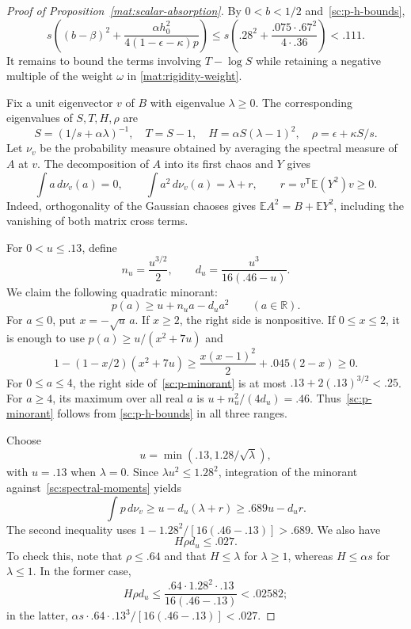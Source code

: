 \documentclass[11pt]{article}
\theoremstyle{definition}
\theoremstyle{remark}
\numberwithin{equation}{section}
\begin{document}
\begin{proof}[Proof of Proposition~\ref{mat:scalar-absorption}]
By $0<b<1/2$ and~\eqref{sc:p-h-bounds},
\begin{equation}\label{sc:y-cost}
 s\left((b-\beta)^2+
 \frac{\alpha h_0^2}{4(1-\epsilon-\kappa)p}\right)
 \le s\left(.28^2+\frac{.075\cdot .67^2}{4\cdot .36}\right)<.111.
\end{equation}
It remains to bound the terms involving $T-\log S$ while retaining a
negative multiple of the weight $\omega$ in
\eqref{mat:rigidity-weight}.

Fix a unit eigenvector $v$ of $B$ with eigenvalue $\lambda\ge0$.
The corresponding eigenvalues of $S,T,H,\rho$
are
\[
 S=(1/s+\alpha\lambda)^{-1},\quad T=S-1,\quad
 H=\alpha S(\lambda-1)^2,\quad \rho=\epsilon+\kappa S/s.
\]
Let $\nu_v$ be the probability measure obtained by averaging the spectral
measure of $A$ at $v$.  The decomposition of $A$ into its first chaos and
$Y$ gives
\begin{equation}\label{sc:spectral-moments}
 \int a\,d\nu_v(a)=0,\qquad
 \int a^2\,d\nu_v(a)=\lambda+r,
 \qquad r=v^{\mathsf T}\mathbb E(Y^2)v\ge0.
\end{equation}
Indeed, orthogonality of the Gaussian chaoses gives
$\mathbb E A^2=B+\mathbb E Y^2$, including the vanishing of both matrix cross terms.

For $0<u\le.13$, define
\[
 n_u=\frac{u^{3/2}}{2},\qquad
 d_u=\frac{u^3}{16(.46-u)}.
\]
We claim the following quadratic minorant:
\begin{equation}\label{sc:p-minorant}
 p(a)\ge u+n_ua-d_ua^2\qquad(a\in\mathbb R).
\end{equation}
For $a\le0$, put $x=-\sqrt u\,a$.  If $x\ge2$, the right side is
nonpositive.  If $0\le x\le2$, it is enough to use
$p(a)\ge u/(x^2+7u)$ and
\[
 1-(1-x/2)(x^2+7u)
 \ge \frac{x(x-1)^2}{2}+.045(2-x)\ge0.
\]
For $0\le a\le4$, the right side of~\eqref{sc:p-minorant} is at most
$.13+2(.13)^{3/2}<.25$.  For $a\ge4$, its maximum over all real $a$ is
$u+n_u^2/(4d_u)=.46$.  Thus~\eqref{sc:p-minorant} follows from
\eqref{sc:p-h-bounds} in all three ranges.

Choose
\[
 u=\min(.13,1.28/\sqrt\lambda),
\]
with $u=.13$ when $\lambda=0$.  Since $\lambda u^2\le1.28^2$, integration of the
minorant against~\eqref{sc:spectral-moments} yields
\begin{equation}\label{sc:p-mean}
 \int p\,d\nu_v\ge u-d_u(\lambda+r)
 \ge .689u-d_ur.
\end{equation}
The second inequality uses
$1-1.28^2/[16(.46-.13)]>.689$.
We also have
\begin{equation}\label{sc:rho-loss}
 H\rho d_u\le .027.
\end{equation}
To check this, note that $\rho\le.64$ and that $H\le\lambda$ for $\lambda\ge1$,
whereas $H\le\alpha s$ for $\lambda\le1$.  In the former case,
\[
 H\rho d_u\le
 \frac{.64\cdot1.28^2\cdot.13}{16(.46-.13)}<.02582;
\]
in the latter, $\alpha s\cdot.64\cdot .13^3/[16(.46-.13)]<.027$.


\end{proof}
\end{document}
